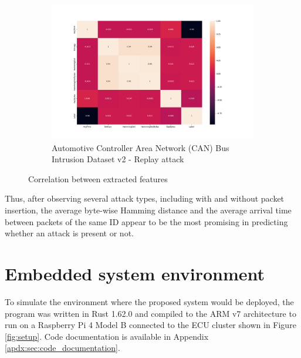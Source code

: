 \begin{figure}
    \begin{subfigure}[b]{.6\linewidth}
        \centering
        \includegraphics[width = \linewidth]{img/parts/app/feature_correlation/OpelAstra/replay.png}
        \caption{Automotive Controller Area Network (CAN) Bus Intrusion Dataset v2 - Replay attack}
        \label{subfig:fe_tue_opelastra}
    \end{subfigure}
    
    \caption{Correlation between extracted features}
    \label{fig:fe}
\end{figure}

Thus, after observing several attack types, including with and without packet insertion, the average byte-wise Hamming distance and the average arrival time between packets of the same ID appear to be the most promising in predicting whether an attack is present or not.

\section{Embedded system environment}

To simulate the environment where the proposed system would be deployed, the program was written in Rust 1.62.0 and compiled to the ARM v7 architecture to run on a Raspberry Pi 4 Model B connected to the ECU cluster shown in Figure \ref{fig:setup}. Code documentation is available in Appendix \ref{apdx:sec:code_documentation}.\par

